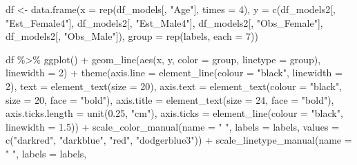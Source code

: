 \documentclass[
  letterpaper,
  DIV=11,
  numbers=noendperiod]{scrreprt}
\newenvironment{Shaded}{\begin{snugshade}}{\end{snugshade}}
\newcommand{\AttributeTok}[1]{\textcolor[rgb]{0.40,0.45,0.13}{#1}}
\newcommand{\DecValTok}[1]{\textcolor[rgb]{0.68,0.00,0.00}{#1}}
\newcommand{\FloatTok}[1]{\textcolor[rgb]{0.68,0.00,0.00}{#1}}
\newcommand{\FunctionTok}[1]{\textcolor[rgb]{0.28,0.35,0.67}{#1}}
\newcommand{\NormalTok}[1]{\textcolor[rgb]{0.00,0.23,0.31}{#1}}
\newcommand{\OtherTok}[1]{\textcolor[rgb]{0.00,0.23,0.31}{#1}}
\newcommand{\SpecialCharTok}[1]{\textcolor[rgb]{0.37,0.37,0.37}{#1}}
\newcommand{\StringTok}[1]{\textcolor[rgb]{0.13,0.47,0.30}{#1}}
\begin{document}
\begin{Shaded}
\begin{Highlighting}[]
\NormalTok{df }\OtherTok{\textless{}{-}} \FunctionTok{data.frame}\NormalTok{(}\AttributeTok{x =} \FunctionTok{rep}\NormalTok{(df\_models[, }\StringTok{"Age"}\NormalTok{], }\AttributeTok{times =} \DecValTok{4}\NormalTok{), }\AttributeTok{y =} \FunctionTok{c}\NormalTok{(df\_models2[, }\StringTok{"Est\_Female4"}\NormalTok{],}
\NormalTok{    df\_models2[, }\StringTok{"Est\_Male4"}\NormalTok{], df\_models2[, }\StringTok{"Obs\_Female"}\NormalTok{], df\_models2[, }\StringTok{"Obs\_Male"}\NormalTok{]),}
    \AttributeTok{group =} \FunctionTok{rep}\NormalTok{(labels, }\AttributeTok{each =} \DecValTok{7}\NormalTok{))}

\NormalTok{df }\SpecialCharTok{\%\textgreater{}\%}
    \FunctionTok{ggplot}\NormalTok{() }\SpecialCharTok{+} \FunctionTok{geom\_line}\NormalTok{(}\FunctionTok{aes}\NormalTok{(x, y, }\AttributeTok{color =}\NormalTok{ group, }\AttributeTok{linetype =}\NormalTok{ group), }\AttributeTok{linewidth =} \DecValTok{2}\NormalTok{) }\SpecialCharTok{+}
    \FunctionTok{theme}\NormalTok{(}\AttributeTok{axis.line =} \FunctionTok{element\_line}\NormalTok{(}\AttributeTok{colour =} \StringTok{"black"}\NormalTok{, }\AttributeTok{linewidth =} \DecValTok{2}\NormalTok{), }\AttributeTok{text =} \FunctionTok{element\_text}\NormalTok{(}\AttributeTok{size =} \DecValTok{20}\NormalTok{),}
        \AttributeTok{axis.text =} \FunctionTok{element\_text}\NormalTok{(}\AttributeTok{colour =} \StringTok{"black"}\NormalTok{, }\AttributeTok{size =} \DecValTok{20}\NormalTok{, }\AttributeTok{face =} \StringTok{"bold"}\NormalTok{), }\AttributeTok{axis.title =} \FunctionTok{element\_text}\NormalTok{(}\AttributeTok{size =} \DecValTok{24}\NormalTok{,}
            \AttributeTok{face =} \StringTok{"bold"}\NormalTok{), }\AttributeTok{axis.ticks.length =} \FunctionTok{unit}\NormalTok{(}\FloatTok{0.25}\NormalTok{, }\StringTok{"cm"}\NormalTok{), }\AttributeTok{axis.ticks =} \FunctionTok{element\_line}\NormalTok{(}\AttributeTok{colour =} \StringTok{"black"}\NormalTok{,}
            \AttributeTok{linewidth =} \FloatTok{1.5}\NormalTok{)) }\SpecialCharTok{+} \FunctionTok{scale\_color\_manual}\NormalTok{(}\AttributeTok{name =} \StringTok{" "}\NormalTok{, }\AttributeTok{labels =}\NormalTok{ labels, }\AttributeTok{values =} \FunctionTok{c}\NormalTok{(}\StringTok{"darkred"}\NormalTok{,}
    \StringTok{"darkblue"}\NormalTok{, }\StringTok{"red"}\NormalTok{, }\StringTok{"dodgerblue3"}\NormalTok{)) }\SpecialCharTok{+} \FunctionTok{scale\_linetype\_manual}\NormalTok{(}\AttributeTok{name =} \StringTok{" "}\NormalTok{, }\AttributeTok{labels =}\NormalTok{ labels,}

\end{Highlighting}
\end{Shaded}
\end{document}
